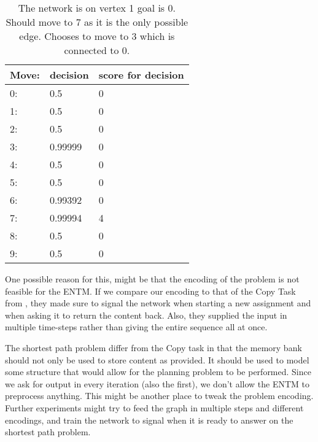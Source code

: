 \begin{table}
	\centering
	\begin{tabular}{|l|l|l|}
		\hline
		Move:&	decision & score for decision\\
		\hline
		0:&	0.5 & 0 \\
		\hline
		1:&	0.5	& 0\\
		\hline
		2:&	0.5	& 0\\
		\hline
		3:&	0.99999 & 0\\
		\hline
		4:&	0.5	& 0\\
		\hline
		5:&	0.5	& 0\\
		\hline
		6:&	0.99392 & 0\\
		\hline
		7:&	0.99994 & 4\\
		\hline
		8:&	0.5 & 0	\\
		\hline
		9:&	0.5 & 0\\
		\hline
	\end{tabular}
	\caption{The network is on vertex 1 goal is 0. Should move to 7 as it is the only possible edge. Chooses to move to 3 which is connected to 0.}
	\label{table:analysis:1}
\end{table}

\newpar One possible reason for this, might be that the encoding of the problem is not feasible for the ENTM. If we compare our encoding to that of the Copy Task from \cite{greve2016evolving}, they made sure to signal the network when starting a new assignment and when asking it to return the content back. Also, they supplied the input in multiple time-steps rather than giving the entire sequence all at once.

\newpar The shortest path problem differ from the Copy task in that the memory bank should not only be used to store content as provided. It should be used to model some structure that would allow for the planning problem to be performed. Since we ask for output in every iteration (also the first), we don't allow the ENTM to preprocess anything. This might be another place to tweak the problem encoding. Further experiments might try to feed the graph in multiple steps and different encodings, and train the network to signal when it is ready to answer on the shortest path problem.